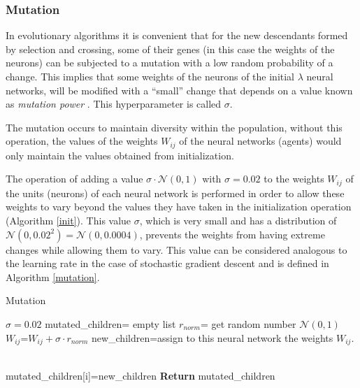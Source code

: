\documentclass{iosart2c}
\begin{document}
\subsubsection{Mutation}

In evolutionary algorithms it is convenient that for the new descendants formed by selection and crossing, some of their genes (in this case the weights of the neurons) can be subjected to a mutation with a low random probability of a change. This implies that some weights of the neurons of the initial $\lambda$ neural networks, will be modified with a ``small'' change that depends on a value known as \textit{mutation power} \cite{deepGA}. This hyperparameter is called $\sigma$. 

The mutation occurs to maintain diversity within the population, without this operation, the values of the weights $W_{ij}$ of the neural networks (agents) would only maintain the values obtained from initialization.

The operation of adding a value $\sigma\cdot \mathcal{N}(0,1)$ with $\sigma=0.02$ to the weights $W_{ij}$ of the units (neurons) of each neural network is performed in order to allow these weights to vary beyond the values they have taken in the initialization operation (Algorithm \ref{init}). This value $\sigma$, which is very small and has a distribution of $\mathcal{N}(0,0.02^2)=\mathcal{N}(0,0.0004)$, prevents the weights from having extreme changes while allowing them to vary. This value can be considered analogous to the learning rate in the case of stochastic gradient descent and is defined in Algorithm \ref{mutation}.



\begin{algorithm}[h!]
\caption{Mutation} \label{mutation}
\begin{algorithmic}[1]
\State $\sigma=0.02$ 
\State mutated\_children= empty list
     
                \State $r_{norm}$= get random number $\mathcal{N}(0,1)$
                \State $W_{ij}$=$W_{ij}+\sigma\cdot r_{norm}$ 
                \State new\_children=assign to this neural network the weights $W_{ij}$.
            
\EndFor \\
        \State mutated\_children[i]=new\_children
\EndFor
\State \textbf{Return} mutated\_children
\EndFunction
\end{algorithmic}
\end{algorithm}
\end{document}
